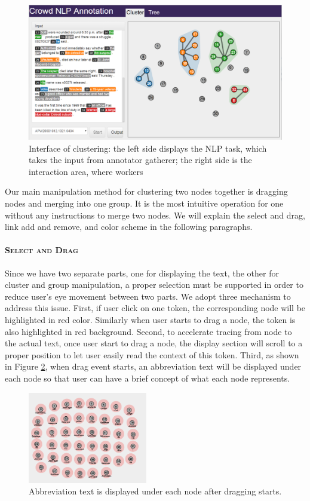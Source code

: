 \begin{figure}[th]
\centering
\includegraphics[width=6.1in]{figs/interface1_v2.png}
\caption{Interface of clustering: the left side displays the NLP task, which takes the input from annotator gatherer; the right side is the interaction area, where workers}
\label{fig:interface1.png}
\end{figure}

Our main manipulation method for clustering two nodes together is dragging nodes and merging into one group. It is the most intuitive operation for one without any instructions to merge two nodes. We will explain the select and drag, link add and remove, and color scheme in the following paragraphs.

\paragraph{\textsc{Select and Drag}\\}
Since we have two separate parts, one for displaying the text, the other for cluster and group manipulation, a proper selection must be supported in order to reduce user's eye movement between two parts. We adopt three mechanism to address this issue. First, if user click on one token, the corresponding node will be highlighted in red color. Similarly when user starts to drag a node, the token is also highlighted in red background. Second, to accelerate tracing from node to the actual text, once user start to drag a node, the display section will scroll to a proper position to let user easily read the context of this token. Third, as shown in Figure \ref{fig:abbrtext}, when drag event starts, an abbreviation text will be displayed under each node so that user can have a brief concept of what each node represents.

\begin{figure}[tH]
\begin{center}
\includegraphics[height=4cm]{figs/abbrText.jpg}
\caption{Abbreviation text is displayed under each node after dragging starts.}
\label{fig:abbrtext}
\end{center}
\end{figure}

